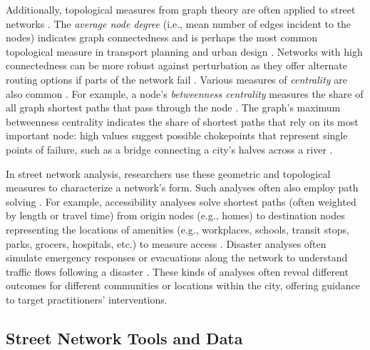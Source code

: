 \documentclass[12pt,letterpaper]{article} %
\begin{document}
Additionally, topological measures from graph theory are often applied to street networks \citep{barthelemy_spatial_2022}. The \textit{average node degree} (i.e., mean number of edges incident to the nodes) indicates graph connectedness and is perhaps the most common topological measure in transport planning and urban design \citep[e.g.,][]{barrington-leigh_century_2015,barrington-leigh_more_2017,barrington-leigh_global_2020}. Networks with high connectedness can be more robust against perturbation as they offer alternate routing options if parts of the network fail \citep{boeing_resilient_2024}. Various measures of \textit{centrality} are also common \citep{crucitti_centrality_2006}. For example, a node's \textit{betweenness centrality} measures the share of all graph shortest paths that pass through the node \citep{barthelemy_betweenness_2004,barthelemy_self-organization_2013}. The graph's maximum betweenness centrality indicates the share of shortest paths that rely on its most important node: high values suggest possible chokepoints that represent single points of failure, such as a bridge connecting a city's halves across a river \citep{boeing_resilient_2024}.

In street network analysis, researchers use these geometric and topological measures to characterize a network's form. Such analyses often also employ path solving \citep{miller_measuring_1999,wang_road_2020}. For example, accessibility analyses solve shortest paths (often weighted by length or travel time) from origin nodes (e.g., homes) to destination nodes representing the locations of amenities (e.g., workplaces, schools, transit stops, parks, grocers, hospitals, etc.) to measure access \citep{foti_behavioral_2014,liu_generalized_2022}. Disaster analyses often simulate emergency responses or evacuations along the network to understand traffic flows following a disaster \citep{sasabe_road_2020,tamakloe_finding_2021}. These kinds of analyses often reveal different outcomes for different communities or locations within the city, offering guidance to target practitioners' interventions.

\subsection{Street Network Tools and Data}
\end{document}
